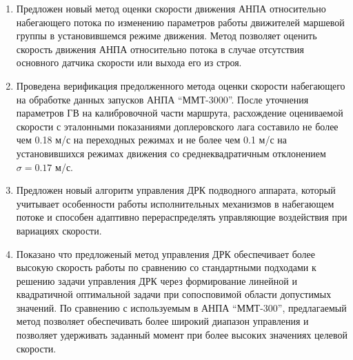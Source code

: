 \begin{enumerate}
  \item Предложен новый метод оценки скорости движения АНПА относительно набегающего потока по изменению параметров работы движителей маршевой группы в установившемся режиме движения. Метод позволяет оценить скорость движения АНПА относительно потока в случае отсутствия основного датчика скорости или выхода его из строя.
  \item Проведена верификация предолженного метода оценки скорости набегающего на обработке данных запусков АНПА ``ММТ-3000''. После уточнения параметров ГВ на калибровочной части маршрута, расхождение оцениваемой скорости с эталонными показаниями доплеровского лага составило не более чем 0.18 м/с на переходных режимах и не более чем 0.1 м/с на установившихся режимах движения со среднеквадратичным отклонением $\sigma=0.17$ м/с.
  \item Предложен новый алгоритм управления ДРК подводного аппарата, который учитывает особенности работы исполнительных механизмов в набегающем потоке и способен адаптивно перераспределять управляющие воздействия при вариациях скорости.
  \item Показано что предложеный метод управления ДРК обеспечивает более высокую скорость работы по сравнению со стандартными подходами к решению задачи управления ДРК через формирование линейной и квадратичной оптимальной задачи при сопосповимой области допустимых значений. По сравнению с используемым в АНПА ``ММТ-300'', предлагаемый метод позволяет обеспечивать более широкий диапазон управления и позволяет удерживать заданный момент при более высоких значениях целевой скорости.
\end{enumerate}
